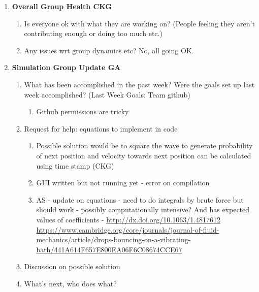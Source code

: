 \begin{enumerate}
\item  \textbf{Overall Group Health CKG}

\begin{enumerate}
\item Is everyone ok with what they are working on? (People feeling they aren't contributing enough or doing too much etc.)

\item  Any issues wrt group dynamics etc? No, all going OK.

\end{enumerate}

\item  \textbf{Simulation Group Update GA}

\begin{enumerate}
\item \textbf{ }What has been accomplished in the past week? Were the goals set up last week accomplished? (Last Week Goals: Team github)

\begin{enumerate}
\item  Github permissions are tricky
\end{enumerate}

\item  Request for help: equations to implement in code

\begin{enumerate}
\item  Possible solution would be to square the wave to generate probability of next position and velocity towards next position can be calculated using time stamp (CKG)

\item  GUI written but not running yet - error on compilation

\item  AS - update on equations - need to do integrals by brute force but should work - possibly computationally intensive? And has expected values of coefficients - \url{http://dx.doi.org/10.1063/1.4817612} \url{https://www.cambridge.org/core/journals/journal-of-fluid-mechanics/article/drops-bouncing-on-a-vibrating-bath/441A614F657E800EA06F6C08674CCE67}
\end{enumerate}

\item  Discussion on possible solution

\item  What's next, who does what?


\end{enumerate}
\end{enumerate}
